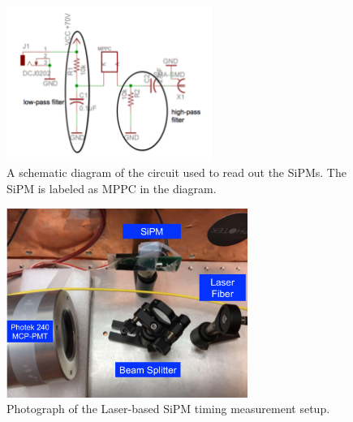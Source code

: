 \begin{figure}[htbp]
\centering
\includegraphics[width=0.60\textwidth]{figures/CircuitDiagramNew.pdf}
\caption{A schematic diagram of the circuit used to read out the SiPMs. The SiPM is labeled as MPPC in the diagram. }
\label{fig:Circuit}
\end{figure}



\begin{figure}[htbp] 
\centering
\includegraphics[width=0.70\textwidth]{figures/SiPMSetup1.pdf} 
\caption{Photograph of the Laser-based SiPM timing measurement setup.} 
\label{fig:laserSetup} 
\end{figure} 

